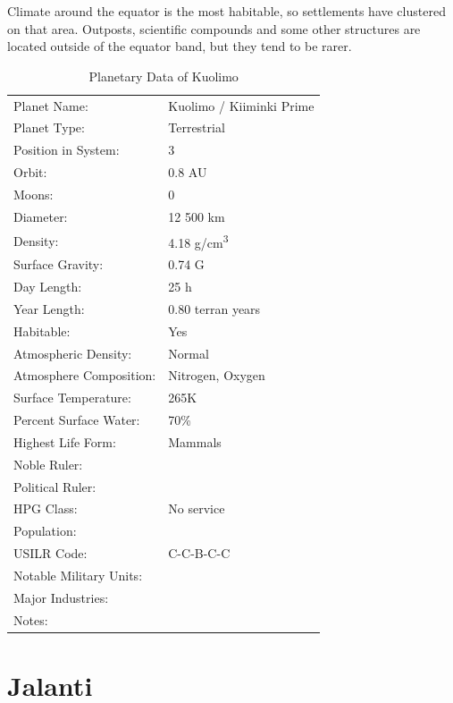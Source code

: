 \documentclass{tufte-book}
\begin{document}
Climate around the equator is the most habitable, so settlements have
clustered on that area. Outposts, scientific compounds and some other
structures are located outside of the equator band, but they tend to
be rarer.

\bigskip
\begin{table}
\begin{minipage}{\textwidth}
\begin{center}
\begin{tabular}{ll}
\toprule
Planet Name: & Kuolimo / Kiiminki Prime \\
Planet Type: & Terrestrial \\
Position in System: & 3 \\
Orbit: & 0.8 AU \\
Moons: & 0 \\
Diameter: & 12 500 km \\
Density: & 4.18 g/cm\textsuperscript{3} \\
Surface Gravity: & 0.74 G \\
Day Length: & 25 h \\
Year Length: & 0.80 terran years \\
Habitable: & Yes \\
\quad Atmospheric Density: & Normal \\
\quad Atmosphere Composition: & Nitrogen, Oxygen \\
\quad Surface Temperature: & 265K \\
\quad Percent Surface Water: & 70\% \\
\quad Highest Life Form: & Mammals \\
\toprule
Noble Ruler: & \\
Political Ruler: & \\
HPG Class: & No service \\
Population: & \\
USILR Code: & C-C-B-C-C \\
Notable Military Units: & \\
Major Industries: & \\
Notes: & \\

\bottomrule
\end{tabular}
\end{center}
\end{minipage}
\caption{Planetary Data of Kuolimo}
\end{table}

\section{Jalanti}
\end{document}
